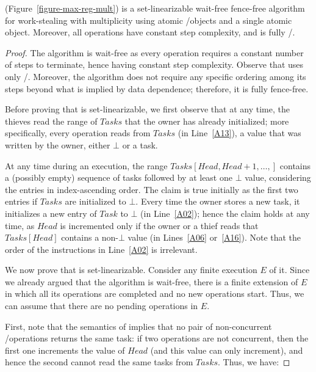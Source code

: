 \begin{theorem}\label{theo-wf}
  \WFWSM (Figure~\ref{figure-max-reg-mult}) is a set-linearizable wait-free fence-free algorithm for work-stealing with multiplicity using atomic \R/\W objects and a single atomic \MaxReg object. Moreover, all operations have constant step complexity, and \Put is fully \R/\W.
\end{theorem}

\begin{proof}

The algorithm is wait-free as every operation requires a constant number of steps to terminate, hence having constant step complexity.  Observe that \Put uses only \R/\W.  Moreover, the algorithm does not require any specific ordering among its steps beyond what is implied by data dependence; therefore, it is fully fence-free.

Before proving that \WFWSM is set-linearizable, we first observe that at any time, the thieves read the range of \(Tasks\) that the owner has already initialized; more specifically, every \Steal operation reads from \(Tasks\) (in Line~\ref{A13}), a value that was written by the owner, either \(\bot\) or a task.

At any time during an execution, the range \(Tasks[Head, Head+1, \hdots, ]\) contains a (possibly empty) sequence of tasks followed by at least one \(\bot\) value, considering the entries in index-ascending order. The claim is true initially as the first two entries if \(Tasks\) are initialized to \(\bot\).  Every time the owner stores a new task, it initializes a new entry of \(Task\) to \(\bot\) (in Line~\ref{A02}); hence the claim holds at any time, as \(Head\) is incremented only if the owner or a thief reads that \(Tasks[Head]\) contains a non-\(\bot\) value (in Lines~\ref{A06} or~\ref{A16}).  Note that the order of the instructions in Line~\ref{A02} is irrelevant.

We now prove that \WFWSM is set-linearizable. Consider any finite execution \(E\) of it. Since we already argued that the algorithm is wait-free, there is a finite extension of \(E\) in which all its operations are completed and no new operations start.  Thus, we can assume that there are no pending operations in \(E\).

First, note that the semantics of \MaxW implies that no pair of non-concurrent \Take/\Steal operations returns the same task: if two operations are not concurrent, then the first one increments the value of \(Head\) (and this value can only increment), and hence the second cannot read the same tasks from \(Tasks\). Thus, we have:


\end{proof}
